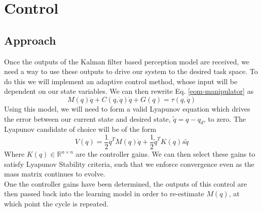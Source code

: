 \section{Control}
\subsection{Approach}
Once the outputs of the Kalman filter based perception model are received, we need a way to use these outputs to drive our system to the desired task space. To do this we will implement an adaptive control method, whose input will be dependent on our state variables. We can then rewrite Eq. \ref{eom-manipulator} as
\begin{equation}
	M(q)\ddot{q} + C(q,\dot{q})\dot{q} + G(q) = \tau(q,\dot{q})
	\label{eq:adaptContr}
\end{equation}
Using this model, we will need to form a valid Lyapunov equation which drives the error between our current state and desired state, $\tilde{q} = q - q_{d}$, to zero. The Lyapunov candidate of choice will be of the form
\begin{equation}
	V(q) = \frac{1}{2}\dot{q}^{T}M(q)\dot{q} + \frac{1}{2}\tilde{q}^{T}K(q)s\tilde{q}
	\label{eq:lyapcand}
\end{equation}
Where $K(q)\in\mathbb{R}^{n\times n}$ are the controller gains. We can then select these gains to satisfy Lyapunov Stability criteria, such that we enforce convergence even as the mass matrix continues to evolve.\\

One the controller gains have been determined, the outputs of this control are then passed back into the learning model in order to re-estimate $M(q)$, at which point the cycle is repeated.
